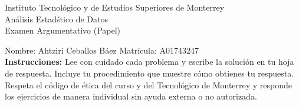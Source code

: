 \documentclass[10pt]{report}
\begin{document}
\newpage



\begin{center}
{\large Instituto Tecnol\'{o}gico y de Estudios Superiores de Monterrey \\
An\'alisis Estad\'stico de Datos } \\
Examen Argumentativo (Papel)
\end{center}

Nombre: \underline{\hspace*{.2in}}
Ahtziri Ceballos B\'aez
\underline{\hspace*{.2in}} \quad Matr\'icula:\underline{\hspace*{.2in}}
A01743247
\underline{\hspace*{.2in}} \\

{\bf Instrucciones:} Lee con cuidado cada problema y escribe la soluci\'on
en tu hoja de respuesta. Incluye tu procedimiento que muestre c\'omo obtienes tu respuesta.  Respeta el c\'odigo de \'etica del curso y del Tecnol\'ogico de Monterrey y responde los ejercicios de manera individual sin ayuda externa o no autorizada.
\end{document}
